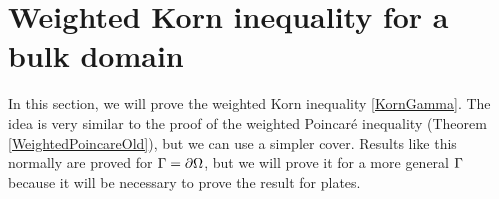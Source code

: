 \section{Weighted Korn inequality for a bulk domain}
\label{sec:bulkWKorn}

In this section, we will prove the weighted Korn inequality \ref{KornGamma}. The idea is very similar to the proof of the weighted Poincaré inequality (Theorem \ref{WeightedPoincareOld}), but we can use a simpler cover. Results like this normally are proved for $\Gamma=\partial\Omega$, but we will prove it for a more general $\Gamma$ because it will be necessary to prove the result for plates.

